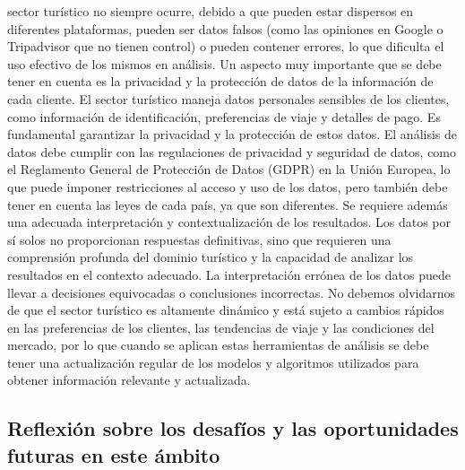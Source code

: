 \documentclass[
  letterpaper,
  DIV=11,
  numbers=noendperiod]{scrreprt}
\begin{document}
sector turístico no siempre ocurre, debido a que pueden estar dispersos
en diferentes plataformas, pueden ser datos falsos (como las opiniones
en Google o Tripadvisor que no tienen control) o pueden contener
errores, lo que dificulta el uso efectivo de los mismos en análisis. Un
aspecto muy importante que se debe tener en cuenta es la privacidad y la
protección de datos de la información de cada cliente. El sector
turístico maneja datos personales sensibles de los clientes, como
información de identificación, preferencias de viaje y detalles de pago.
Es fundamental garantizar la privacidad y la protección de estos datos.
El análisis de datos debe cumplir con las regulaciones de privacidad y
seguridad de datos, como el Reglamento General de Protección de Datos
(GDPR) en la Unión Europea, lo que puede imponer restricciones al acceso
y uso de los datos, pero también debe tener en cuenta las leyes de cada
país, ya que son diferentes. Se requiere además una adecuada
interpretación y contextualización de los resultados. Los datos por sí
solos no proporcionan respuestas definitivas, sino que requieren una
comprensión profunda del dominio turístico y la capacidad de analizar
los resultados en el contexto adecuado. La interpretación errónea de los
datos puede llevar a decisiones equivocadas o conclusiones incorrectas.
No debemos olvidarnos de que el sector turístico es altamente dinámico y
está sujeto a cambios rápidos en las preferencias de los clientes, las
tendencias de viaje y las condiciones del mercado, por lo que cuando se
aplican estas herramientas de análisis se debe tener una actualización
regular de los modelos y algoritmos utilizados para obtener información
relevante y actualizada.

\hypertarget{reflexiuxf3n-sobre-los-desafuxedos-y-las-oportunidades-futuras-en-este-uxe1mbito}{%
\subsection{Reflexión sobre los desafíos y las oportunidades futuras en
este
ámbito}\label{reflexiuxf3n-sobre-los-desafuxedos-y-las-oportunidades-futuras-en-este-uxe1mbito}}
\end{document}
